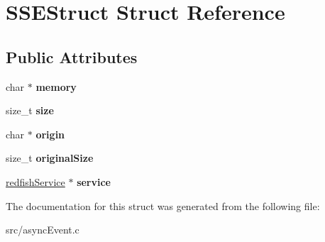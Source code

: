 \hypertarget{structSSEStruct}{}\section{S\+S\+E\+Struct Struct Reference}
\label{structSSEStruct}
\subsection*{Public Attributes}
\begin{DoxyCompactItemize}
\item 
\mbox{\label{structSSEStruct_af5380b29ec4696aa94dca8a24a8501d6}} 
char $\ast$ {\bfseries memory}
\item 
\mbox{\label{structSSEStruct_a62dfab31ae9bd5dacb76c70d5e55f4e7}} 
size\+\_\+t {\bfseries size}
\item 
\mbox{\label{structSSEStruct_a1e1c3a8535bdfb5ea2b8c3ec32dce721}} 
char $\ast$ {\bfseries origin}
\item 
\mbox{\label{structSSEStruct_ac88c2399b72c5637595536117a665132}} 
size\+\_\+t {\bfseries original\+Size}
\item 
\mbox{\label{structSSEStruct_a36ed2639a100ba8a79a39dd4f9cdb43a}} 
\hyperlink{redfishService_8h_a4c9115c0f0a21de971c0dfae06f26372}{redfish\+Service} $\ast$ {\bfseries service}
\end{DoxyCompactItemize}


The documentation for this struct was generated from the following file\+:\begin{DoxyCompactItemize}
\item 
src/async\+Event.\+c\end{DoxyCompactItemize}
